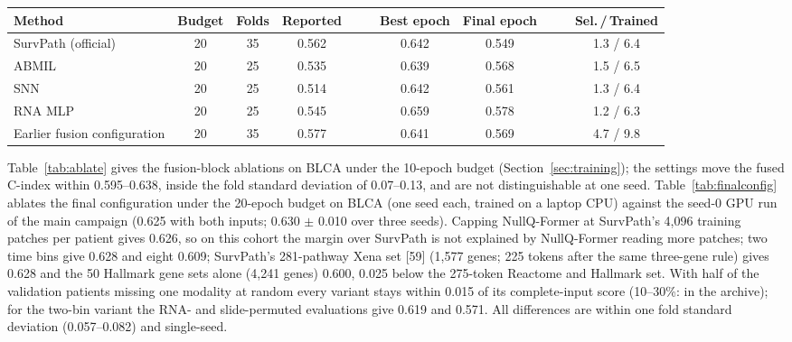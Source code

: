 \documentclass[9pt,journal]{IEEEtran}
\newcommand{\pq}{NullQ-Former}
\newcommand{\cindex}{C-index}
\begin{document}
\begin{table}[!t]
\begin{tabular}{@{}lcccccccccc@{}}
Method & Budget & Folds & Reported & & & Best epoch & Final epoch & & & Sel.\,/\,Trained \\
\midrule
SurvPath (official) & 20 & 35 & 0.562 & & & 0.642 & 0.549 & & & 1.3 / 6.4 \\
ABMIL & 20 & 25 & 0.535 & & & 0.639 & 0.568 & & & 1.5 / 6.5 \\
SNN & 20 & 25 & 0.514 & & & 0.642 & 0.561 & & & 1.3 / 6.4 \\
RNA MLP & 20 & 25 & 0.545 & & & 0.659 & 0.578 & & & 1.2 / 6.3 \\
Earlier fusion configuration & 20 & 35 & 0.577 & & & 0.641 & 0.569 & & & 4.7 / 9.8 \\
\bottomrule
\end{tabular}
\end{table}

Table~\ref{tab:ablate} gives the fusion-block ablations on BLCA under the 10-epoch budget (Section~\ref{sec:training}); the settings move the fused \cindex{} within 0.595--0.638, inside the fold standard deviation of 0.07--0.13, and are not distinguishable at one seed. Table~\ref{tab:finalconfig} ablates the final configuration under the 20-epoch budget on BLCA (one seed each, trained on a laptop CPU) against the seed-0 GPU run of the main campaign (0.625 with both inputs; 0.630 $\pm$ 0.010 over three seeds). Capping \pq{} at SurvPath's 4,096 training patches per patient gives 0.626, so on this cohort the margin over SurvPath is not explained by \pq{} reading more patches; two time bins give 0.628 and eight 0.609; SurvPath's 281-pathway Xena set [59] (1,577 genes; 225 tokens after the same three-gene rule) gives 0.628 and the 50 Hallmark gene sets alone (4,241 genes) 0.600, 0.025 below the 275-token Reactome and Hallmark set. With half of the validation patients missing one modality at random every variant stays within 0.015 of its complete-input score (10--30\%: in the archive); for the two-bin variant the RNA- and slide-permuted evaluations give 0.619 and 0.571. All differences are within one fold standard deviation (0.057--0.082) and single-seed.
\end{document}
